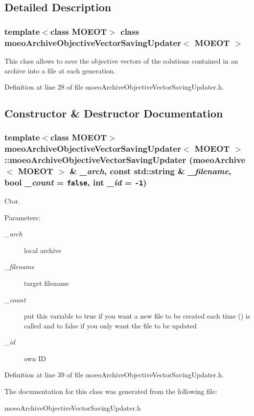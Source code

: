 \subsection{Detailed Description}
\subsubsection*{template$<$class MOEOT$>$ class moeo\-Archive\-Objective\-Vector\-Saving\-Updater$<$ MOEOT $>$}

This class allows to save the objective vectors of the solutions contained in an archive into a file at each generation. 



Definition at line 28 of file moeo\-Archive\-Objective\-Vector\-Saving\-Updater.h.

\subsection{Constructor \& Destructor Documentation}
\subsubsection{\setlength{\rightskip}{0pt plus 5cm}template$<$class MOEOT$>$ \bf{moeo\-Archive\-Objective\-Vector\-Saving\-Updater}$<$ MOEOT $>$::\bf{moeo\-Archive\-Objective\-Vector\-Saving\-Updater} (\bf{moeo\-Archive}$<$ MOEOT $>$ \& {\em \_\-arch}, const std::string \& {\em \_\-filename}, bool {\em \_\-count} = {\tt false}, int {\em \_\-id} = {\tt -1})\hspace{0.3cm}{\tt  [inline]}}\label{classmoeoArchiveObjectiveVectorSavingUpdater_d9f70d24605ccd1e89c8b4ea4c96c333}


Ctor. 

\begin{Desc}
\item[Parameters:]
\begin{description}
\item[{\em \_\-arch}]local archive \item[{\em \_\-filename}]target filename \item[{\em \_\-count}]put this variable to true if you want a new file to be created each time () is called and to false if you only want the file to be updated \item[{\em \_\-id}]own ID \end{description}
\end{Desc}


Definition at line 39 of file moeo\-Archive\-Objective\-Vector\-Saving\-Updater.h.

The documentation for this class was generated from the following file:\begin{CompactItemize}
\item 
moeo\-Archive\-Objective\-Vector\-Saving\-Updater.h\end{CompactItemize}
